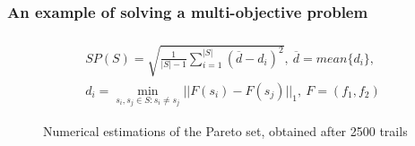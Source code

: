 \documentclass[aspectratio=1610]{beamer}
\begin{document}
\begin{frame}
  \frametitle{An example of solving a multi-objective problem}
  \vspace*{-1.0cm}
  \begin{displaymath}
    \begin{array}{cr}\\
      SP(S)=\sqrt{\frac{1}{|S|-1} \sum_{i=1}^{|S|} (\overline{d}-d_i)^2},\:\overline{d}=mean\{d_i\}, \\
      d_i=\min_{s_i,s_j\in S:s_i\ne s_j}||F(s_i)-F(s_j)||_1,\: F=(f_1,f_2)
    \end{array}
  \end{displaymath}

  \begin{figure}[ht]
      \centering
      \vspace*{-0.5cm}
      \caption{Numerical estimations of the Pareto set, obtained after 2500 trails}
      \label{fig:mco_pareto}
  \end{figure}
\end{frame}
\end{document}
